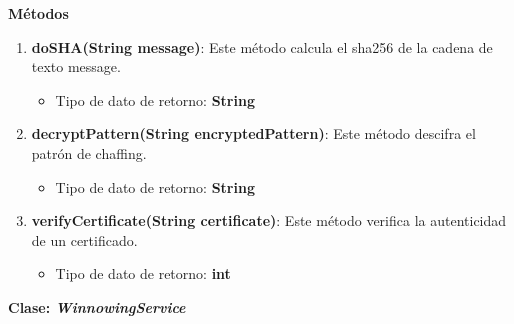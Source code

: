 \documentclass[12pt, a4paper, titlepage]{report}
\begin{document}
		            \textbf{Métodos}
    		        \begin{enumerate}
    		            \item \textbf{doSHA(String message)}: Este método calcula el sha256 de la cadena de texto message.
    		            \begin{itemize}
    		                \item Tipo de dato de retorno: \textbf{String}
    		            \end{itemize}
    		            \item \textbf{decryptPattern(String encryptedPattern)}: Este método descifra el patrón de chaffing.
    		            \begin{itemize}
    		                \item Tipo de dato de retorno: \textbf{String}
    		            \end{itemize}
    		            \item \textbf{verifyCertificate(String certificate)}: Este método verifica la autenticidad de un certificado.
    		            \begin{itemize}
    		                \item Tipo de dato de retorno: \textbf{int}
    		            \end{itemize}
    		        \end{enumerate} 
    		        
    		        
    		    
    		    \textbf{\textcolor{guindapoli}{Clase: \textit{WinnowingService}}}\\
                    
\end{document}
